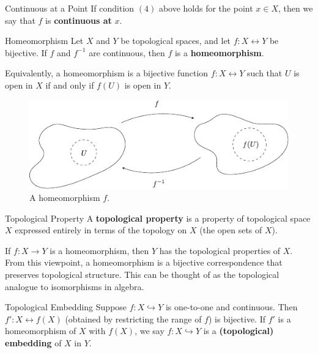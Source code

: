 \documentclass[10pt]{report}
\begin{document}
\begin{defn}{Continuous at a Point}{}
	If condition $(4)$ above holds for the point $x \in X$, then we say that $f$ is \textbf{continuous at} $x$.
\end{defn}

\begin{defn}{Homeomorphism}{}
	Let $X$ and $Y$ be topological spaces, and let $f: X \leftrightarrow Y$ be bijective. If $f$ and $f^{-1}$ are continuous, then $f$ is a \textbf{homeomorphism}.

	Equivalently, a homeomorphism is a bijective function $f: X \leftrightarrow Y$ such that $U$ is open in $X$ if and only if $f(U)$ is open in $Y$.
\end{defn}

\begin{figure}[H]
	\centering
	\includegraphics[scale=1.3]{fig/homeomorphism.pdf}
	\caption{A homeomorphism $f$.}
\end{figure}

\begin{defn}{Topological Property}{}
	A \textbf{topological property} is a property of topological space $X$ expressed entirely in terms of the topology on $X$ (the open sets of $X$).
\end{defn}

If $f:X \to Y$ is a homeomorphism, then $Y$ has the topological properties of $X$. From this viewpoint, a homeomorphism is a bijective correspondence that preserves topological structure. This can be thought of as the topological analogue to isomorphisms in algebra.

\begin{defn}{Topological Embedding}{}
	Suppose $f: X \hookrightarrow Y$ is one-to-one and continuous. Then $f':X \leftrightarrow f(X)$ (obtained by restricting the range of $f$) is bijective. If $f'$ is a homeomorphism of $X$ with $f(X)$, we say $f: X \hookrightarrow  Y$ is a \textbf{(topological) embedding} of $X$ in $Y$.
\end{defn}
\end{document}
